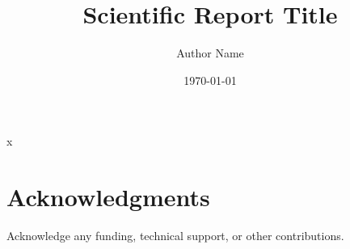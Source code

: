 x\documentclass[12pt,a4paper]{article}
\title{Scientific Report Title}
\author{Author Name}
\date{\today}
\begin{document}
\maketitle








\section*{Acknowledgments}
Acknowledge any funding, technical support, or other contributions.



\end{document}
